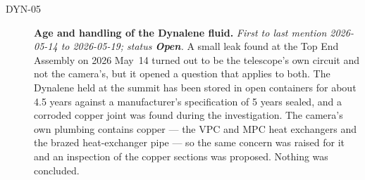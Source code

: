 \begin{description}
\item[DYN-05]\label{iss:DYN-05} \textbf{Age and handling of the Dynalene fluid.}
  \emph{First to last mention 2026-05-14 to 2026-05-19; status \textcolor{stopn}{\textbf{Open}}.}
  A small leak found at the Top End Assembly on 2026 May~14 turned out to be the telescope's own circuit and not the camera's, but it opened a question that applies to both.  The Dynalene held at the summit has been stored in open containers for about 4.5 years against a manufacturer's specification of 5 years sealed, and a corroded copper joint was found during the investigation.  The camera's own plumbing contains copper --- the VPC and MPC heat exchangers and the brazed heat-exchanger pipe --- so the same concern was raised for it and an inspection of the copper sections was proposed.  Nothing was concluded.

\end{description}


